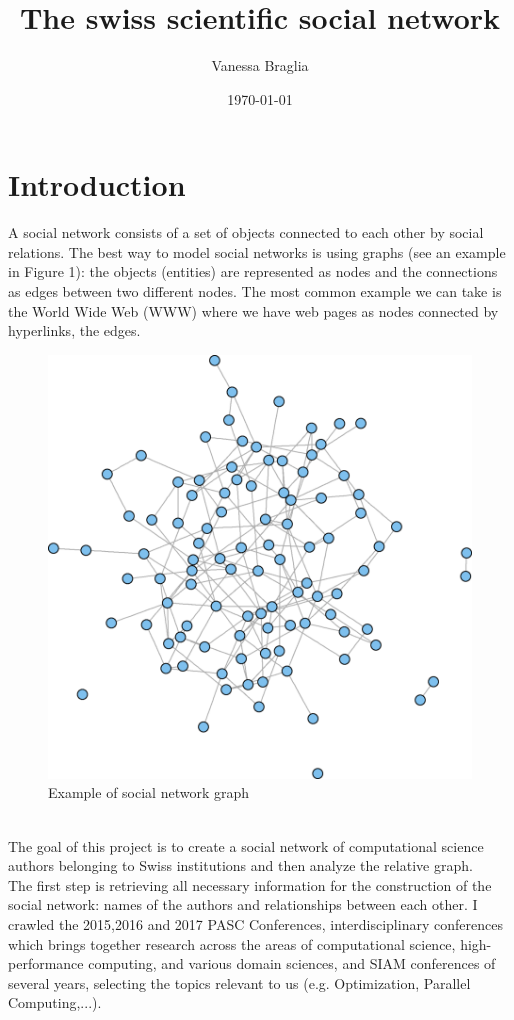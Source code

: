 \documentclass[12 pt]{article}
\author{Vanessa Braglia}
\title{The swiss scientific social network}
\date{\today}
\begin{document}
\selectfont
\maketitle 
\newpage
\tableofcontents
\newpage
\section{Introduction}
A social network consists of a set of objects connected to each other by social relations. The best way to model social networks is using graphs (see an example in Figure 1): the objects (entities) are represented as nodes and the connections as edges between two different nodes. The most common example we can take is the World Wide Web (WWW) where we have web pages as nodes connected by hyperlinks, the edges.\\
\begin{figure} [h!]
\centering 
\includegraphics[scale=0.5]{graph.png}
\caption{Example of social network graph}
\end{figure}
\\
The goal of this project is to create a social network of computational science authors belonging to Swiss institutions and then analyze the relative graph.\\
The first step is retrieving all necessary information for the construction of the social network: names of the authors and relationships between each other. I crawled the 2015,2016 and 2017 PASC Conferences, interdisciplinary conferences which brings together research across the areas of computational science, high-performance computing, and various domain sciences, and SIAM conferences of several years, selecting the topics relevant to us (e.g. Optimization, Parallel Computing,...). \\
\end{document}
